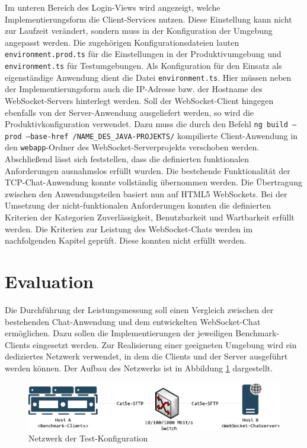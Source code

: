 \documentclass[11pt,a4paper,titlepage]{scrartcl}
\numberwithin{equation}{section}
\begin{document}
\noindent Im unteren Bereich des Login-Views wird angezeigt, welche Implementierungsform die Client-Services nutzen. Diese Einstellung kann nicht zur Laufzeit verändert, sondern muss in der Konfiguration der Umgebung angepasst werden. Die zugehörigen Konfigurationsdateien lauten \texttt{environment.prod.ts} für die Einstellungen in der Produktivumgebung und \texttt{environment.ts} für Testumgebungen. Als Konfiguration für den Einsatz als eigenständige Anwendung dient die Datei \texttt{environment.ts}. Hier müssen neben der Implementierungsform auch die IP-Adresse bzw. der Hostname des WebSocket-Servers hinterlegt werden. Soll der WebSocket-Client hingegen ebenfalls von der Server-Anwendung ausgeliefert werden, so wird die Produktivkonfiguration verwendet. Dazu muss die durch den Befehl \texttt{ng build --prod --base-href /NAME\_DES\_JAVA-PROJEKTS/} kompilierte Client-Anwendung in den \texttt{webapp}-Ordner des WebSocket-Serverprojekts verschoben werden.\\

\noindent Abschließend lässt sich feststellen, dass die definierten funktionalen Anforderungen ausnahmslos erfüllt wurden. Die bestehende Funktionalität der TCP-Chat-Anwendung konnte vollständig übernommen werden. Die Übertragung zwischen den Anwendungsteilen basiert nun auf HTML5 WebSockets. Bei der Umsetzung der nicht-funktionalen Anforderungen konnten die definierten Kriterien der Kategorien Zuverlässigkeit, Benutzbarkeit und Wartbarkeit erfüllt werden. Die Kriterien zur Leistung des WebSocket-Chats werden im nachfolgenden Kapitel geprüft. Diese konnten nicht erfüllt werden.

\newpage
\section{Evaluation}\label{sec:Evaluation}
Die Durchführung der Leistungsmessung soll einen Vergleich zwischen der bestehenden Chat-Anwendung und dem entwickelten WebSocket-Chat ermöglichen. Dazu sollen die Implementierungen der jeweiligen Benchmark-Clients eingesetzt werden. Zur Realisierung einer geeigneten Umgebung wird ein dediziertes Netzwerk verwendet, in dem die Clients und der Server ausgeführt werden können. Der Aufbau des Netzwerks ist in Abbildung \ref{fig:evalNetwork} dargestellt.
\medskip
\begin{figure}[ht] 
	\begin{center}
		\includegraphics[scale=1]{img/umgebung.pdf}
		\caption{Netzwerk der Test-Konfiguration}
		\label{fig:evalNetwork}
	\end{center}
\end{figure}
\end{document}
